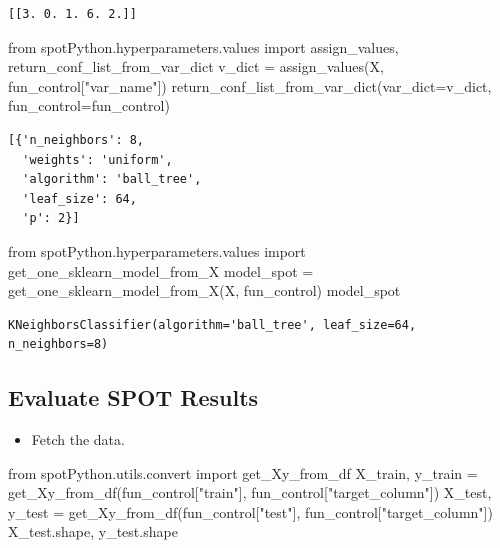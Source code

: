 \documentclass[
  letterpaper,
  DIV=11,
  numbers=noendperiod]{scrreprt}
\newenvironment{Shaded}{\begin{snugshade}}{\end{snugshade}}
\newcommand{\ImportTok}[1]{\textcolor[rgb]{0.00,0.46,0.62}{#1}}
\newcommand{\NormalTok}[1]{\textcolor[rgb]{0.00,0.23,0.31}{#1}}
\newcommand{\OperatorTok}[1]{\textcolor[rgb]{0.37,0.37,0.37}{#1}}
\newcommand{\StringTok}[1]{\textcolor[rgb]{0.13,0.47,0.30}{#1}}
\providecommand{\tightlist}{%
  \setlength{\itemsep}{0pt}\setlength{\parskip}{0pt}}\usepackage{longtable,booktabs,array}
\begin{document}
\begin{verbatim}
[[3. 0. 1. 6. 2.]]
\end{verbatim}

\begin{Shaded}
\begin{Highlighting}[]
\ImportTok{from}\NormalTok{ spotPython.hyperparameters.values }\ImportTok{import}\NormalTok{ assign\_values, return\_conf\_list\_from\_var\_dict}
\NormalTok{v\_dict }\OperatorTok{=}\NormalTok{ assign\_values(X, fun\_control[}\StringTok{"var\_name"}\NormalTok{])}
\NormalTok{return\_conf\_list\_from\_var\_dict(var\_dict}\OperatorTok{=}\NormalTok{v\_dict, fun\_control}\OperatorTok{=}\NormalTok{fun\_control)}
\end{Highlighting}
\end{Shaded}

\begin{verbatim}
[{'n_neighbors': 8,
  'weights': 'uniform',
  'algorithm': 'ball_tree',
  'leaf_size': 64,
  'p': 2}]
\end{verbatim}

\begin{Shaded}
\begin{Highlighting}[]
\ImportTok{from}\NormalTok{ spotPython.hyperparameters.values }\ImportTok{import}\NormalTok{ get\_one\_sklearn\_model\_from\_X}
\NormalTok{model\_spot }\OperatorTok{=}\NormalTok{ get\_one\_sklearn\_model\_from\_X(X, fun\_control)}
\NormalTok{model\_spot}
\end{Highlighting}
\end{Shaded}

\begin{verbatim}
KNeighborsClassifier(algorithm='ball_tree', leaf_size=64, n_neighbors=8)
\end{verbatim}

\hypertarget{evaluate-spot-results-3}{%
\subsection{Evaluate SPOT Results}\label{evaluate-spot-results-3}}

\begin{itemize}
\tightlist
\item
  Fetch the data.
\end{itemize}

\begin{Shaded}
\begin{Highlighting}[]
\ImportTok{from}\NormalTok{ spotPython.utils.convert }\ImportTok{import}\NormalTok{ get\_Xy\_from\_df}
\NormalTok{X\_train, y\_train }\OperatorTok{=}\NormalTok{ get\_Xy\_from\_df(fun\_control[}\StringTok{"train"}\NormalTok{], fun\_control[}\StringTok{"target\_column"}\NormalTok{])}
\NormalTok{X\_test, y\_test }\OperatorTok{=}\NormalTok{ get\_Xy\_from\_df(fun\_control[}\StringTok{"test"}\NormalTok{], fun\_control[}\StringTok{"target\_column"}\NormalTok{])}
\NormalTok{X\_test.shape, y\_test.shape}
\end{Highlighting}
\end{Shaded}
\end{document}
